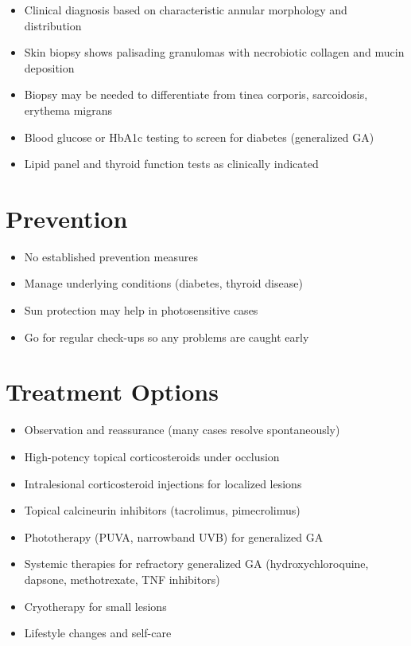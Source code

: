 \begin{itemize}[noitemsep]
  \item Clinical diagnosis based on characteristic annular morphology and distribution
  \item Skin biopsy shows palisading granulomas with necrobiotic collagen and mucin deposition
  \item Biopsy may be needed to differentiate from tinea corporis, sarcoidosis, erythema migrans
  \item Blood glucose or HbA1c testing to screen for diabetes (generalized GA)
  \item Lipid panel and thyroid function tests as clinically indicated
\end{itemize}

\section{Prevention}

\begin{itemize}[noitemsep]
  \item No established prevention measures
  \item Manage underlying conditions (diabetes, thyroid disease)
  \item Sun protection may help in photosensitive cases
  \item Go for regular check-ups so any problems are caught early
\end{itemize}

\section{Treatment Options}

\begin{itemize}[noitemsep]
  \item Observation and reassurance (many cases resolve spontaneously)
  \item High-potency topical corticosteroids under occlusion
  \item Intralesional corticosteroid injections for localized lesions
  \item Topical calcineurin inhibitors (tacrolimus, pimecrolimus)
  \item Phototherapy (PUVA, narrowband UVB) for generalized GA
  \item Systemic therapies for refractory generalized GA (hydroxychloroquine, dapsone, methotrexate, TNF inhibitors)
  \item Cryotherapy for small lesions
  \item Lifestyle changes and self-care
\end{itemize}

